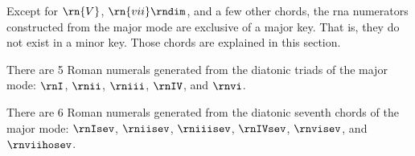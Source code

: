 
Except for $\rn{V}$, $\rn{vii}\rndim$, and a few other
chords, the \gls{rna} numerators constructed from the major
mode are exclusive of a major key. That is, they do not
exist in a minor key. Those chords are explained in this
section.


There are 5 Roman numerals generated from the diatonic
triads of the major mode: $\rnI$, $\rnii$, $\rniii$,
$\rnIV$, and $\rnvi$.



There are 6 Roman numerals generated from the diatonic
seventh chords of the major mode: $\rnIsev$, $\rniisev$,
$\rniiisev$, $\rnIVsev$, $\rnvisev$, and $\rnviihosev$.
